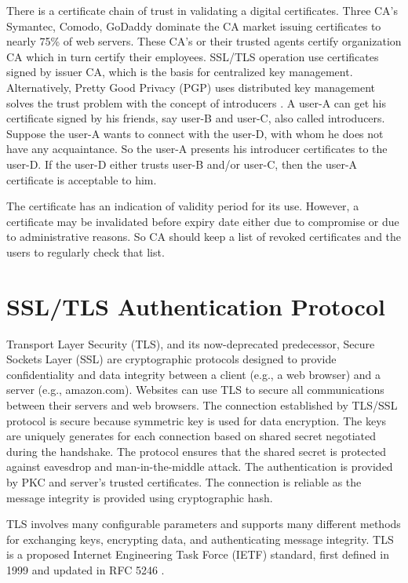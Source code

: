 \begin{multicols}{2}
There is a certificate chain of trust in validating a digital certificates. Three CA's Symantec, Comodo, GoDaddy dominate the CA market issuing certificates to nearly 75\% of web servers. These CA's or their trusted agents certify organization CA which in turn certify their employees. SSL/TLS operation use certificates signed by issuer CA, which is the basis for centralized key management. Alternatively, Pretty Good Privacy (PGP) uses distributed key management solves the trust problem with the concept of introducers \cite{chap2-key1}. A user-A can get his certificate signed by his friends, say user-B and user-C, also called introducers. Suppose the user-A wants to connect with the user-D, with whom he does not have any acquaintance. So the user-A presents his introducer certificates to the user-D. If the user-D either trusts user-B and/or user-C, then the user-A certificate is acceptable to him.

The certificate has an indication of validity period for its use. However, a certificate may be invalidated before expiry date either due to compromise or due to administrative reasons. So CA should keep a list of revoked certificates and the users to regularly check that list.

\section*{SSL/TLS Authentication Protocol}

Transport Layer Security (TLS), and its now-deprecated predecessor, Secure Sockets Layer (SSL) are cryptographic protocols designed to provide confidentiality and data integrity between a client (e.g., a web browser) and a server (e.g., amazon.com). Websites can use TLS to secure all communications between their servers and web browsers. The connection established by TLS/SSL protocol is secure because symmetric key is used for data encryption. The keys are uniquely generates for each connection based on shared secret negotiated during the handshake. The protocol ensures that the shared secret is protected against eavesdrop and man-in-the-middle attack. The authentication is provided by PKC and server's trusted certificates. The connection is reliable as the message integrity is provided using cryptographic hash.

TLS involves many configurable parameters and supports many different methods for exchanging keys, encrypting data, and authenticating message integrity. TLS is a proposed Internet Engineering Task Force (IETF) standard, first defined in 1999 and updated in RFC 5246 \cite{chap2-key16}.


\end{multicols}

